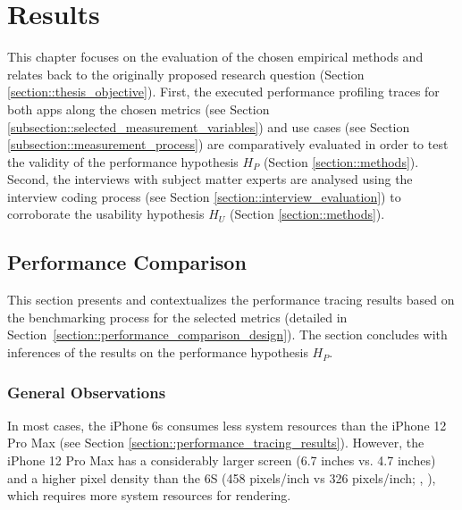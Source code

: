 
\chapter{Results} \label{chapter::results}
This chapter focuses on the evaluation of the chosen empirical methods and relates back to the originally proposed research question (Section \ref{section::thesis_objective}).
First, the executed performance profiling traces for both apps along the chosen metrics (see Section \ref{subsection::selected_measurement_variables}) and use cases (see Section \ref{subsection::measurement_process}) 
are comparatively evaluated in order to test the validity of the performance hypothesis $H_P$ (Section \ref{section::methods}).
Second, the interviews with subject matter experts are analysed using the interview coding process (see Section \ref{section::interview_evaluation}) to corroborate the usability hypothesis $H_U$ (Section \ref{section::methods}).

\section{Performance Comparison} \label{section::performance_comparison}
This section presents and contextualizes the performance tracing results based on the benchmarking process for the selected metrics (detailed in Section \ref{section::performance_comparison_design}).
The section concludes with inferences of the results on the performance hypothesis $H_P$.

\subsection{General Observations}
In most cases, the iPhone 6s consumes less system resources than the iPhone 12 Pro Max (see Section \ref{section::performance_tracing_results}).
However, the iPhone 12 Pro Max has a considerably larger screen (6.7 inches vs. 4.7 inches) and a higher pixel density than the 6S (458 pixels/inch vs 326 pixels/inch; \cite{Apple2021d}, \cite{Apple2021c}), which requires more system resources for rendering.


